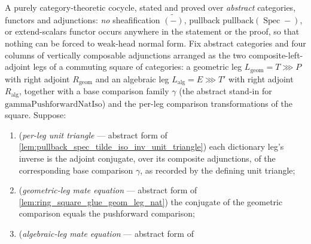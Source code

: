\begin{lemma}
  \label{lem:ring_square_cocycle}
  A purely category-theoretic cocycle, stated and proved over \emph{abstract} categories, functors
  and adjunctions: \emph{no} sheafification \(\widetilde{(-)}\), pullback
  \(\mathrm{pullback}(\operatorname{Spec}-)\), or extend-scalars functor occurs anywhere in the
  statement or the proof, so that nothing can be forced to weak-head normal form. Fix abstract
  categories and four columns of vertically composable adjunctions arranged as the two
  composite-left-adjoint legs of a commuting square of categories: a geometric leg
  \(L_{\mathrm{geom}} = T \ggg P\) with right adjoint \(R_{\mathrm{geom}}\) and an algebraic leg
  \(L_{\mathrm{alg}} = E \ggg T'\) with right adjoint \(R_{\mathrm{alg}}\), together with a base
  comparison family \(\gamma\) (the abstract stand-in for \(\mathrm{gammaPushforwardNatIso}\)) and the
  per-leg comparison transformations of the square. Suppose:
  \begin{enumerate}
    \item[(i)] (\emph{per-leg unit triangle} --- abstract form of
      \cref{lem:pullback_spec_tilde_iso_inv_unit_triangle}) each dictionary leg's inverse is the
      adjoint conjugate, over its composite adjunctions, of the corresponding base comparison
      \(\gamma\), as recorded by the defining unit triangle;
    \item[(ii)] (\emph{geometric-leg mate equation} --- abstract form of
      \cref{lem:ring_square_glue_geom_leg_nat}) the conjugate of the geometric comparison equals the
      pushforward comparison;
    \item[(iii)] (\emph{algebraic-leg mate equation} --- abstract form of

\end{enumerate}
\end{lemma}
